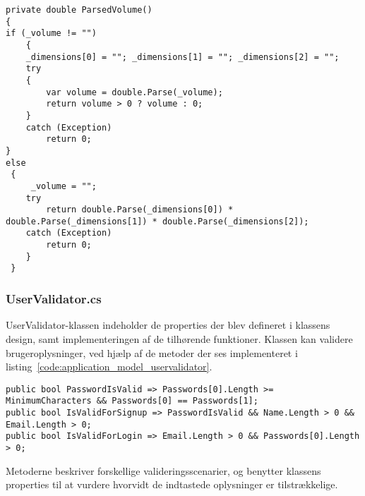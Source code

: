 \begin{lstlisting}[caption={ParsedVolume()},label={code:application_model_parsedvolume}]
private double ParsedVolume()
{
if (_volume != "")
	{
	_dimensions[0] = ""; _dimensions[1] = ""; _dimensions[2] = "";
	try
	{
		var volume = double.Parse(_volume);
		return volume > 0 ? volume : 0;
	}
	catch (Exception)
		return 0;
}
else
 {
	 _volume = "";
	try
		return double.Parse(_dimensions[0]) * double.Parse(_dimensions[1]) * double.Parse(_dimensions[2]);
	catch (Exception)
		return 0;
	}
 }
\end{lstlisting}

\subsubsection{UserValidator.cs}
UserValidator-klassen indeholder de properties der blev defineret i klassens design, samt implementeringen af de tilhørende funktioner. Klassen kan validere brugeroplysninger, ved hjælp af de metoder der ses implementeret i listing~\ref{code:application_model_uservalidator}.

\begin{lstlisting}[caption={UserValidator valideringsmetoder},label={code:application_model_uservalidator}]
public bool PasswordIsValid => Passwords[0].Length >= MinimumCharacters && Passwords[0] == Passwords[1];
public bool IsValidForSignup => PasswordIsValid && Name.Length > 0 && Email.Length > 0;
public bool IsValidForLogin => Email.Length > 0 && Passwords[0].Length > 0;
\end{lstlisting}

Metoderne beskriver forskellige valideringsscenarier, og benytter klassens properties til at vurdere hvorvidt de indtastede oplysninger er tilstrækkelige.